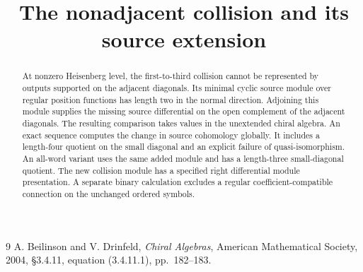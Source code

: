 \documentclass[11pt,oneside]{memoir}
\title{The nonadjacent collision and its source extension}
\author{}
\date{}
\begin{document}
\maketitle
\begin{abstract}
At nonzero Heisenberg level, the first-to-third collision cannot be represented by outputs supported on the adjacent diagonals.
Its minimal cyclic source module over regular position functions has length two in the normal direction.
Adjoining this module supplies the missing source differential on the open complement of the adjacent diagonals.
The resulting comparison takes values in the unextended chiral algebra.
An exact sequence computes the change in source cohomology globally.
It includes a length-four quotient on the small diagonal and an explicit failure of quasi-isomorphism.
An all-word variant uses the same added module and has a length-three small-diagonal quotient.
The new collision module has a specified right differential module presentation.
A separate binary calculation excludes a regular coefficient-compatible connection on the unchanged ordered symbols.
\end{abstract}

\begin{thebibliography}{9}
A. Beilinson and V. Drinfeld,
\emph{Chiral Algebras}, American Mathematical Society, 2004,
\S3.4.11, equation (3.4.11.1), pp.~182--183.
\end{thebibliography}
\end{document}
